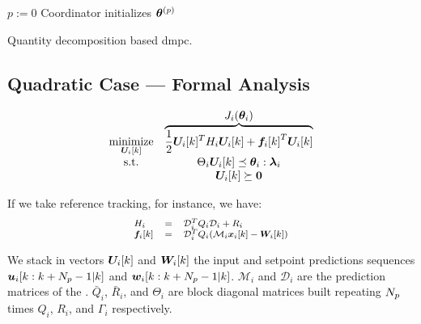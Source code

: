 \documentclass{ifacconf}  %
\begin{document}
\begin{algorithm2e}[h]
  \DontPrintSemicolon%
  $p:=0$\;
  Coordinator initializes $\boldsymbol{\theta}^{(p)}$ \;
 \caption{Quantity decomposition based \acrlong{dmpc}.}\label{alg:quantityAlg}
\end{algorithm2e}

\subsection{Quadratic Case --- Formal Analysis}\label{ssec:FA}

\begin{equation}
\begin{matrix}
\underset{\Uik}{\mathrm{minimize}}& \overbrace{\frac{1}{2} \Uik^T H_i\Uik+{\fik}^T\Uik}^{\textstyle J_{i}(\vec{\theta}_{i})}\\
\mathrm{s.t.}&\Theta_{i}\Uik\preceq\vec{\theta}_{i}:\vec{\lambda}_{i}\\
&\Uik\succeq\0
\end{matrix}
\label{eq:quadratic_case}
\end{equation}

If we take reference tracking, for instance, we have:
\begin{equation}
\small\begin{matrix*}[l]
 H_i&=&\mathcal{D}_i^T\bar{Q}_i\mathcal{D}_i+\bar{R}_i\\
\fik&=&\mathcal{D}_i^T\bar{Q}_i(\mathcal{M}_i\xik-\Wik)\\

\end{matrix*}
\label{eq:matrices}
\end{equation}

We stack in vectors $\Uik$ and $\Wik$
the input and setpoint predictions sequences ${\uiseq}$ and ${\wiseq}$.
${\mathcal{M}_{i}}$  and ${\mathcal{D}_{i}}$ are the prediction matrices of the \mpc{}.
$\bar{Q}_{i}$, $\bar{R}_{i}$, and $\Theta_{i}$ are block diagonal matrices built repeating $N_{p}$ times $Q_{i}$, $R_{i}$, and $\Gamma_i$ respectively.
\end{document}
